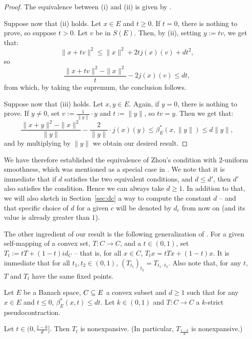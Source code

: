 \documentclass{article}
\begin{document}
\begin{proof}
The equivalence between (i) and (ii) is given by \cite[Corollary 1']{Xu91}.

Suppose now that (ii) holds. Let $x \in E$ and $t\geq 0$. If $t=0$, there is nothing to prove, so suppose $t>0$. Let $v$ be in $S(E)$. Then, by (ii), setting $y:=tv$, we get that:
$$\|x+tv\|^2 \leq \|x\|^2 +2tj(x)(v)+ dt^2,$$
so
$$\frac{\|x+tv\|^2-\|x\|^2}t-2j(x)(v) \leq dt,$$
from which, by taking the supremum, the conclusion follows.

Suppose now that (iii) holds. Let $x,y \in E$. Again, if $y=0$, there is nothing to prove. If $y \neq 0$, set $v:=\frac{1}{\|y\|}\cdot y$ and $t:=\|y\|$, so $tv=y$. Then we get that:
$$\frac{\|x+y\|^2-\|x\|^2}{\|y\|}-\frac{2}{\|y\|}\cdot j(x)(y) \leq \beta^*_E(x,\|y\|) \leq d\|y\|,$$
and by multiplying by $\|y\|$ we obtain our desired result.
\end{proof}

We have therefore established the equivalence of Zhou's condition with $2$-uniform smoothness, which was mentioned as a special case in \cite[p. 762]{Zho14}. We note that it is immediate that if $d$ satisfies the two equivalent conditions, and $d\leq d'$, then $d'$ also satisfies the condition. Hence we can always take $d \geq 1$. In addition to that, we will also sketch in Section~\ref{sec:dc} a way to compute the constant $d$ -- and that specific choice of $d$ for a given $c$ will be denoted by $d_c$ from now on (and its value is already greater than $1$).

The other ingredient of our result is the following generalization of \cite[Theorem 2]{BroPet67}. For a given self-mapping of a convex set, $T: C \to C$, and a $t \in (0,1)$, set $T_t:= tT+(1-t)id_C$ -- that is, for all $x \in C$, $T_tx = tTx + (1-t)x$. It is immediate that for all $t_1, t_2 \in (0,1)$, $(T_{t_1})_{t_2}=T_{t_1 \cdot t_2}$. Also note that, for any $t$, $T$ and $T_t$ have the same fixed points.

\blem\label{l2}
Let $E$ be a Banach space, $C \subseteq E$ a convex subset and $d\geq 1$ such that for any $x \in E$ and $t \leq 0$, $\beta^*_E(x,t) \leq dt$. Let $k \in (0,1)$ and $T : C \to C$ a $k$-strict pseudocontraction.

Let $t \in (0,\frac{1-k}{d}]$. Then $T_t$ is nonexpansive. (In particular, $T_{\frac{1-k}{d}}$ is nonexpansive.)
\elem
\end{document}
